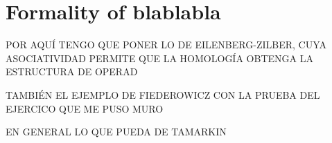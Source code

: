 \documentclass[TFG.tex]{subfiles}
\begin{document}
\chapter{Formality of blablabla}
POR AQUÍ TENGO QUE PONER LO DE EILENBERG-ZILBER, CUYA ASOCIATIVIDAD PERMITE QUE LA HOMOLOGÍA OBTENGA LA ESTRUCTURA DE OPERAD

TAMBIÉN EL EJEMPLO DE FIEDEROWICZ CON LA PRUEBA DEL EJERCICO QUE ME PUSO MURO

EN GENERAL LO QUE PUEDA DE TAMARKIN
\end{document}
